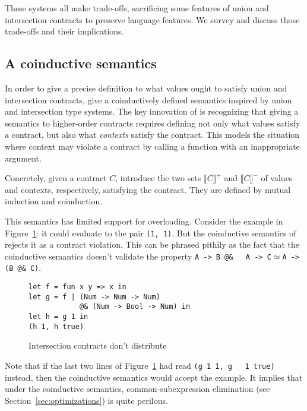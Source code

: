 \documentclass[sigplan,10pt,review,anonymous]{acmart}
\newcommand{\nickel}[1]{\lstinline[language=nickel]{#1}}
\begin{document}
These systems all make trade-offs, sacrificing some features of union
and intersection contracts to preserve language features. We survey
and discuss those trade-offs and their implications.

\subsection{A coinductive semantics}
\label{sec:coinductive-sem}

In order to give a precise definition to what values ought to satisfy
union and intersection contracts, \cite{KeilThiemannUnionIntersection}
give a coinductively defined semantics inspired by union and
intersection type systems. The key innovation of
\cite{KeilThiemannUnionIntersection} is recognizing that giving a
semantics to higher-order contracts requires defining not only what
values satisfy a contract, but also what \emph{contexts} satisfy the
contract. This models the situation where context may violate a
contract by calling a function with an inappropriate argument.

Concretely, given a contract $C$, \cite{KeilThiemannUnionIntersection}
introduce the two sets $\llbracket C \rrbracket^+$ and $\llbracket C
\rrbracket^-$ of values and contexts, respectively, satisfying the
contract. They are defined by mutual induction and coinduction.

This semantics has limited support for overloading. Consider the
example in Figure~\ref{fig:intersection-distribution}: it could
evaluate to the pair \nickel{(1, 1)}. But the coinductive semantics
of~\cite{KeilThiemannUnionIntersection} rejects it as a contract
violation. This can be phrased pithily as the fact that the
coinductive semantics doesn't validate the property \nickel{A -> B @&
  A -> C}$\simeq$\nickel{A -> (B @& C)}.

\begin{figure}[h]
\begin{lstlisting}[language=nickel]
let f = fun x y => x in
let g = f | (Num -> Num -> Num)
            @& (Num -> Bool -> Num) in
let h = g 1 in
(h 1, h true)
\end{lstlisting}
\caption{Intersection contracts don't distribute}
\label{fig:intersection-distribution}
\end{figure}

Note that if the last two lines of
Figure~\ref{fig:intersection-distribution} had read \nickel{(g 1 1, g
  1 true)} instead, then the coinductive semantics would accept the
example. It implies that under the coinductive semantics,
common-subexpression elimination (see Section~\ref{sec:optimizations})
is quite perilous.
\end{document}
